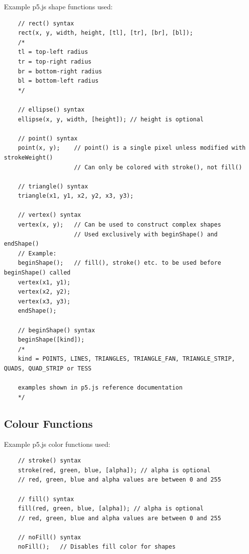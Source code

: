 \documentclass{article}
\begin{document}
\noindent Example p5.js shape functions used:

\begin{verbatim}
    // rect() syntax
    rect(x, y, width, height, [tl], [tr], [br], [bl]);
    /*
    tl = top-left radius
    tr = top-right radius
    br = bottom-right radius
    bl = bottom-left radius
    */

    // ellipse() syntax
    ellipse(x, y, width, [height]); // height is optional
    
    // point() syntax
    point(x, y);    // point() is a single pixel unless modified with strokeWeight()
                    // Can only be colored with stroke(), not fill()
    
    // triangle() syntax
    triangle(x1, y1, x2, y2, x3, y3);

    // vertex() syntax
    vertex(x, y);   // Can be used to construct complex shapes
                    // Used exclusively with beginShape() and endShape()
    // Example:
    beginShape();   // fill(), stroke() etc. to be used before beginShape() called
    vertex(x1, y1);  
    vertex(x2, y2);
    vertex(x3, y3);
    endShape();

    // beginShape() syntax
    beginShape([kind]);
    /*
    kind = POINTS, LINES, TRIANGLES, TRIANGLE_FAN, TRIANGLE_STRIP, QUADS, QUAD_STRIP or TESS

    examples shown in p5.js reference documentation
    */

    \end{verbatim}

\newpage
\subsection*{Colour Functions}
\noindent Example p5.js color functions used:
    
\begin{verbatim}
    // stroke() syntax
    stroke(red, green, blue, [alpha]); // alpha is optional
    // red, green, blue and alpha values are between 0 and 255

    // fill() syntax
    fill(red, green, blue, [alpha]); // alpha is optional
    // red, green, blue and alpha values are between 0 and 255

    // noFill() syntax
    noFill();   // Disables fill color for shapes


\end{verbatim}
\end{document}
